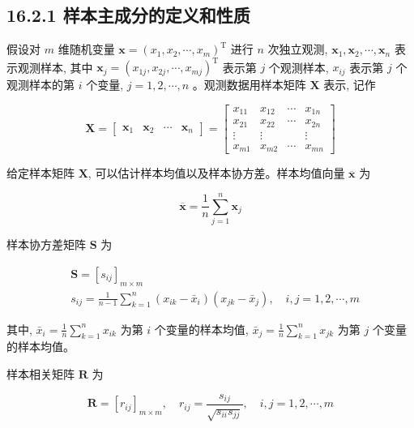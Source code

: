 \documentclass[10pt]{article}
\begin{document}
\subsection*{16.2.1 样本主成分的定义和性质}
假设对 $m$ 维随机变量 $\boldsymbol{x}=\left(x_{1}, x_{2}, \cdots, x_{m}\right)^{\mathrm{T}}$ 进行 $n$ 次独立观测, $\boldsymbol{x}_{1}, \boldsymbol{x}_{2}, \cdots, \boldsymbol{x}_{n}$ 表示观测样本, 其中 $\boldsymbol{x}_{j}=\left(x_{1 j}, x_{2 j}, \cdots, x_{m j}\right)^{\mathrm{T}}$ 表示第 $j$ 个观测样本, $x_{i j}$ 表示第 $j$ 个观测样本的第 $i$ 个变量, $j=1,2, \cdots, n$ 。观测数据用样本矩阵 $\boldsymbol{X}$ 表示, 记作

\[
\boldsymbol{X}=\left[\begin{array}{llll}
\boldsymbol{x}_{1} & \boldsymbol{x}_{2} & \cdots & \boldsymbol{x}_{n}
\end{array}\right]=\left[\begin{array}{cccc}
x_{11} & x_{12} & \cdots & x_{1 n}  \tag{16.39}\\
x_{21} & x_{22} & \cdots & x_{2 n} \\
\vdots & \vdots & & \vdots \\
x_{m 1} & x_{m 2} & \cdots & x_{m n}
\end{array}\right]
\]

给定样本矩阵 $\boldsymbol{X}$, 可以估计样本均值以及样本协方差。样本均值向量 $\overline{\boldsymbol{x}}$ 为


\begin{equation*}
\overline{\boldsymbol{x}}=\frac{1}{n} \sum_{j=1}^{n} \boldsymbol{x}_{j} \tag{16.40}
\end{equation*}


样本协方差矩阵 $\boldsymbol{S}$ 为


\begin{align*}
& \boldsymbol{S}=\left[s_{i j}\right]_{m \times m} \\
& s_{i j}=\frac{1}{n-1} \sum_{k=1}^{n}\left(x_{i k}-\bar{x}_{i}\right)\left(x_{j k}-\bar{x}_{j}\right), \quad i, j=1,2, \cdots, m \tag{16.41}
\end{align*}


其中, $\bar{x}_{i}=\frac{1}{n} \sum_{k=1}^{n} x_{i k}$ 为第 $i$ 个变量的样本均值, $\bar{x}_{j}=\frac{1}{n} \sum_{k=1}^{n} x_{j k}$ 为第 $j$ 个变量的样本均值。

样本相关矩阵 $\boldsymbol{R}$ 为


\begin{equation*}
\boldsymbol{R}=\left[r_{i j}\right]_{m \times m}, \quad r_{i j}=\frac{s_{i j}}{\sqrt{s_{i i} s_{j j}}}, \quad i, j=1,2, \cdots, m \tag{16.42}
\end{equation*}
\end{document}
